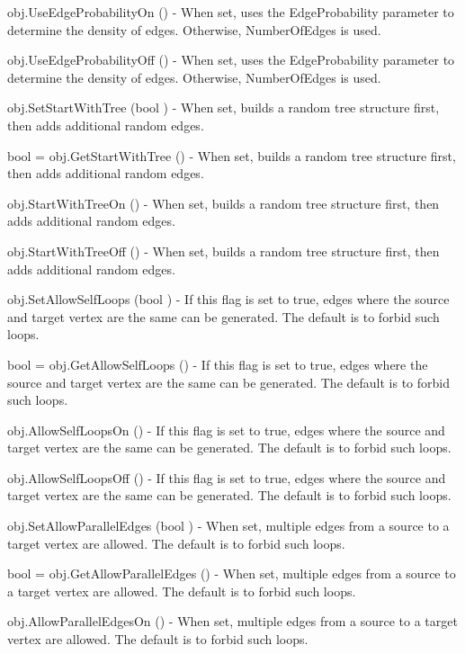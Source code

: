 \begin{DoxyItemize}
\item {\ttfamily obj.\-Use\-Edge\-Probability\-On ()} -\/ When set, uses the Edge\-Probability parameter to determine the density of edges. Otherwise, Number\-Of\-Edges is used.  
\item {\ttfamily obj.\-Use\-Edge\-Probability\-Off ()} -\/ When set, uses the Edge\-Probability parameter to determine the density of edges. Otherwise, Number\-Of\-Edges is used.  
\item {\ttfamily obj.\-Set\-Start\-With\-Tree (bool )} -\/ When set, builds a random tree structure first, then adds additional random edges.  
\item {\ttfamily bool = obj.\-Get\-Start\-With\-Tree ()} -\/ When set, builds a random tree structure first, then adds additional random edges.  
\item {\ttfamily obj.\-Start\-With\-Tree\-On ()} -\/ When set, builds a random tree structure first, then adds additional random edges.  
\item {\ttfamily obj.\-Start\-With\-Tree\-Off ()} -\/ When set, builds a random tree structure first, then adds additional random edges.  
\item {\ttfamily obj.\-Set\-Allow\-Self\-Loops (bool )} -\/ If this flag is set to true, edges where the source and target vertex are the same can be generated. The default is to forbid such loops.  
\item {\ttfamily bool = obj.\-Get\-Allow\-Self\-Loops ()} -\/ If this flag is set to true, edges where the source and target vertex are the same can be generated. The default is to forbid such loops.  
\item {\ttfamily obj.\-Allow\-Self\-Loops\-On ()} -\/ If this flag is set to true, edges where the source and target vertex are the same can be generated. The default is to forbid such loops.  
\item {\ttfamily obj.\-Allow\-Self\-Loops\-Off ()} -\/ If this flag is set to true, edges where the source and target vertex are the same can be generated. The default is to forbid such loops.  
\item {\ttfamily obj.\-Set\-Allow\-Parallel\-Edges (bool )} -\/ When set, multiple edges from a source to a target vertex are allowed. The default is to forbid such loops.  
\item {\ttfamily bool = obj.\-Get\-Allow\-Parallel\-Edges ()} -\/ When set, multiple edges from a source to a target vertex are allowed. The default is to forbid such loops.  
\item {\ttfamily obj.\-Allow\-Parallel\-Edges\-On ()} -\/ When set, multiple edges from a source to a target vertex are allowed. The default is to forbid such loops.  

\end{DoxyItemize}

